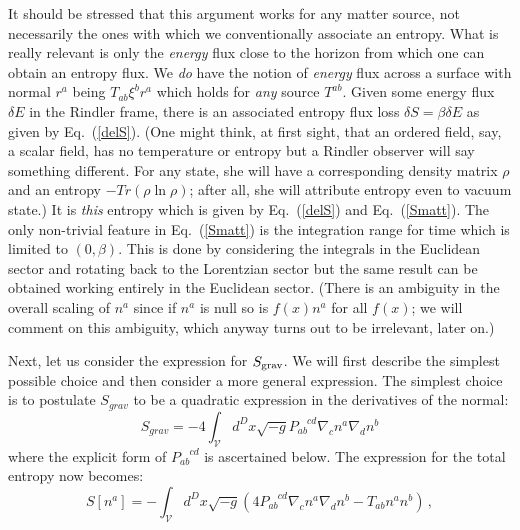 \documentclass[12pt]{iopart}
\def\eq#1{{Eq.~(\ref{#1})}}
\newcommand{\Cal}[1]{\ensuremath{\mathcal{#1}}}
\newcommand{\ph}[1]{\phantom{#1}}
\newcommand{\D}{\ensuremath{\nabla}}
\begin{document}
It should be stressed that this argument works for any matter source, not necessarily the ones with which we conventionally associate an entropy. What is really relevant is only the \textit{energy} flux close to the horizon from which one can obtain an entropy flux.
We \textit{do} have the notion of \textit{energy} flux across a surface with normal $r^a$ being $T_{ab}\xi^br^a$ which holds for \textit{any} source $T^{ab}$. Given some energy flux $\delta E$ in the Rindler frame, there is an associated entropy flux loss $\delta S=\beta\delta E$ as given by \eq{delS}. (One might think, at first sight, that an ordered field, say, a scalar field, has no temperature or entropy but a Rindler observer will say something different. For any state, she will have a corresponding density matrix $\rho$ and an entropy $-Tr(\rho\ln\rho)$; after all, she will attribute entropy even to vacuum state.) It is \textit{this} entropy which is given by \eq{delS} and \eq{Smatt}. 
The only non-trivial feature in \eq{Smatt} is the integration range for time which is limited to $(0,\beta)$. This is done by considering the integrals in the Euclidean sector and rotating back to the Lorentzian sector but the same result can be obtained working entirely in the Euclidean sector. (There is an ambiguity in the overall scaling of $n^a$ since if $n^a$ is null so is $f(x)n^a$ for all $f(x)$; we will comment on this ambiguity, which anyway turns out to be irrelevant, later on.)

Next, let us consider the expression for $S_{\rm grav}$. We will first describe the simplest possible choice and  then consider a more general expression. The simplest choice is to  postulate $S_{grav}$ to be a quadratic expression \cite{aseementropy} in the derivatives of the normal:  
 \begin{equation}
S_{grav}= - 4\int_\Cal{V}{d^Dx\sqrt{-g}}
    P_{ab}^{\ph{a}\ph{b}cd} \D_cn^a\D_dn^b 
    \label{Sgrav}
\end{equation}  
where the explicit form of $P_{ab}^{\ph{a}\ph{b}cd}$ is ascertained below. The expression for the total entropy  now becomes:
\begin{equation}
S[n^a]=-\int_\Cal{V}{d^Dx\sqrt{-g}}
    \left(4P_{ab}^{\ph{a}\ph{b}cd} \D_cn^a\D_dn^b - 
    T_{ab}n^an^b\right) \,,
\label{ent-func-2}
\end{equation}
\end{document}
